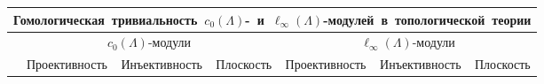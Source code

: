 \begin{scriptsize}
\begin{longtable}{|c|c|c|c|c|c|c|}
\multicolumn{7}{c}{\mbox{Гомологическая тривиальность $c_0(\Lambda)$- и $\ell_\infty(\Lambda)$-модулей в топологической теории}}                                                                                                                                                                                                                                                                                                                                                                                                                                                                                                                                                                                                                         \\
					 
\hline               & \multicolumn{3}{c|}{$c_0(\Lambda)$-модули}                                                                                                                                                                                                                                                                                                                & \multicolumn{3}{c|}{$\ell_\infty(\Lambda)$-модули}                                                                                                                                                                                                                                                                                                        \\
\hline
                     & Проективность                                                                                                & Инъективность                                                                                                &  Плоскость                                                                                                     & Проективность                                                                                                & Инъективность                                                                                                &  Плоскость                                                                                                     \\ 
\hline

\end{longtable}
\end{scriptsize}
